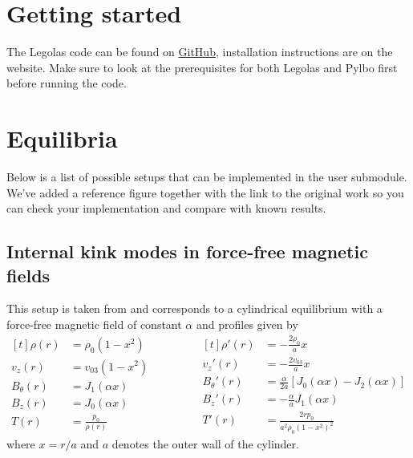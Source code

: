 \documentclass[12pt]{article}
\begin{document}
\pagestyle{fancy}
\renewcommand\headheight{24pt}
\renewcommand\footrulewidth{0.4pt}

\section*{Getting started}
The Legolas code can be found on \href{https://github.com/n-claes/legolas}{GitHub}, installation instructions are on the website. Make sure to look at the prerequisites for both Legolas and Pylbo first before running the code.

\section{Equilibria}
Below is a list of possible setups that can be implemented in the user submodule. We've added a reference figure together with the link to the original work so you can check your implementation and compare with known results.

\subsection{Internal kink modes in force-free magnetic fields}
This setup is taken from \citet{goedbloed2018} and corresponds to a cylindrical equilibrium with a force-free magnetic field of constant $\alpha$ and profiles given by
\begin{equation*}
	\begin{aligned}[t]
		\rho(r) &= \rho_0\left(1 - x^2\right) \\
		v_z(r) &= v_{03}\left(1 - x^2\right) \\
		B_\theta(r) &= J_1(\alpha x) \\
		B_z(r) &= J_0(\alpha x) \\
		T(r) &= \frac{p_0}{\rho(r)}
	\end{aligned}
	\qquad\qquad
	\begin{aligned}[t]
		\rho'(r) &= -\frac{2\rho_0}{a} x \\
		v_z'(r) &= -\frac{2v_{03}}{a} x \\
		B_\theta'(r) &= \frac{\alpha}{2a} \left[J_0(\alpha x) - J_2(\alpha x)\right] \\
		B_z'(r) &= -\frac{\alpha}{a} J_1(\alpha x) \\
		T'(r) &= \frac{2 r p_0}{a^2\rho_0(1 - x^2)^2}
	\end{aligned}
\end{equation*}
where $x = r / a$ and $a$ denotes the outer wall of the cylinder.
\end{document}

